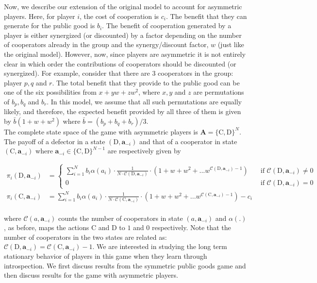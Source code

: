 \documentclass[11pt]{article}
\theoremstyle{plainCl1}
\theoremstyle{plainCl2}
\newcommand{\A}{\mathbf{A}}
\newcommand{\abf}{\mathbf{a}}
\newcommand{\C}{\mathrm{C}}
\newcommand{\D}{\mathrm{D}}
\begin{document}
\noindent Now, we describe our extension of the original model to account for asymmetric players. Here, for player $i$, the cost of cooperation is $c_i$. The benefit that they can generate for the public good is $b_i$. The benefit of cooperation generated by a player is either synergized (or discounted) by a factor depending on the number of cooperators already in the group and the synergy/discount factor, $w$ (just like the original model). However, now, since players are asymmetric it is not entirely clear in which order the contributions of cooperators should be discounted (or synergized). For example, consider that there are $3$ cooperators in the group: player $p, q$ and $r$. The total benefit that they provide to the public good can be one of the six possibilities from $x + y w + z w^2$, where $x,y$ and $z$ are permutations  of $b_p, b_q$ and $b_r$. In this model, we assume that all such permutations are equally likely, and therefore, the expected benefit provided by all three of them is given by $\bar{b}(1 + w + w^2)$ where $\bar{b} = (b_p + b_q + b_r)/3$. \\ 

\noindent The complete state space of the game with asymmetric players is $\A = \{\C,\D\}^N$. The payoff of a defector in a state $(\D, \abf_{-i})$ and that of a cooperator in state $(\C,\abf_{-i})$ where $\abf_{-i} \in \{\C,\D\}^{N-1}$ are respectively given by

\begin{align}
\pi_i(\D, \abf_{-i})&= 
\begin{cases}
\displaystyle \sum_{i=1}^N b_i \alpha(a_i) \cdot \frac{1}{N \cdot \mathcal{C}(\D,\abf_{-i})} \cdot \left(1 + w + w^2 + ...w^{\mathcal{C}(\D,\abf_{-i}) - 1} \right) &\quad  \text{if } \mathcal{C}(\D,\abf_{-i}) \neq 0 \\[15pt]
0 &\quad  \text{if } \mathcal{C}(\D,\abf_{-i}) = 0
\end{cases} \\[15pt]
\pi_i(\C, \abf_{-i}) &= \displaystyle \sum_{i=1}^N b_i \alpha(a_i) \cdot \frac{1}{N \cdot \mathcal{C}(\C,\abf_{-i})} \cdot \left(1 + w + w^2 + ...w^{\mathcal{C}(\C,\abf_{-i}) - 1} \right) - c_i
\label{Eq:payoff-synergistic-asymmetric}
\end{align} \\
\noindent where $\mathcal{C}(a,\abf_{-i})$ counts the number of cooperators in state $(a,\abf_{-i})$ and $\alpha(.)$, as before, maps the actions $\C$ and $\D$ to $1$ and $0$ respectively. Note that the number of cooperators in the two states are related as: $\mathcal{C}(\D,\abf_{-i}) = \mathcal{C}(\C,\abf_{-i}) - 1$. We are interested in studying the long term stationary behavior of players in this game when they learn through introspection. We first discuss results from the symmetric public goods game and then discuss results for the game with asymmetric players.\\
\end{document}
